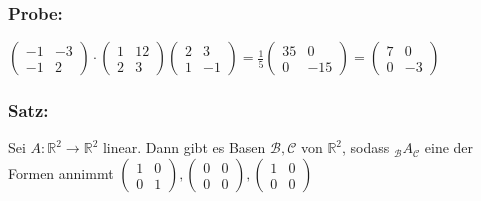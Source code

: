 \subsubsection{Probe:}
$\begin{pmatrix} -1 & -3 \\ -1 & 2 \end{pmatrix} \cdot \begin{pmatrix} 1 & 12 \\ 2 & 3 \end{pmatrix} \begin{pmatrix}2 & 3 \\ 1 & -1 \end{pmatrix} = \frac{1}{5} \begin{pmatrix} 35 & 0 \\ 0 & -15 \end{pmatrix} = \begin{pmatrix} 7 & 0 \\ 0 & -3 \end{pmatrix}$
%
%
%
\subsubsection{Satz:}
Sei $A: \mathbb{R}^{2} \rightarrow \mathbb{R}^{2}$ linear. Dann gibt es Basen $\mathcal{B}, \mathcal{C}$ von $\mathbb{R}^{2}$, sodass $_{\mathcal{B}}A_{\mathcal{C}}$ eine der Formen annimmt $\begin{pmatrix} 1 & 0 \\ 0 & 1 \end{pmatrix}, \begin{pmatrix} 0 & 0 \\ 0 & 0 \end{pmatrix}, \begin{pmatrix} 1 & 0 \\ 0 & 0 \end{pmatrix}$
%
%
%
